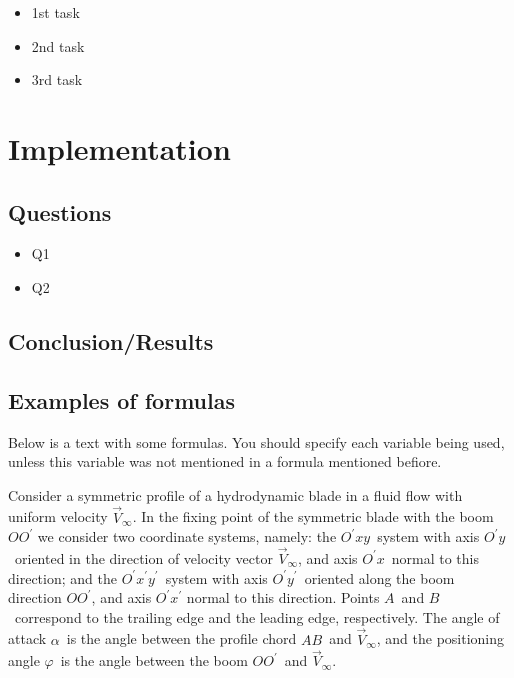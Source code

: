 \documentclass[12pt]{article}
\begin{document}
  \begin{itemize}
    \renewcommand{\labelitemi}{$\circ$}
    \item 1st task
    \item 2nd task
    \item 3rd task
  \end{itemize}


  \section{Implementation}

  \subsection{Questions}

  \begin{itemize}
    \renewcommand{\labelitemi}{$\circ$}
    \item Q1
    \item Q2
   \end{itemize}


    \subsection{Conclusion/Results}

 \subsection{Examples of formulas}
Below is a text with some formulas. You should specify each variable being used, unless this variable was not mentioned in a formula mentioned befiore.

Consider a symmetric profile of a hydrodynamic blade in a fluid flow with uniform velocity $\overrightarrow{V}_{\infty
} $. In the fixing point of the symmetric blade with the boom $OO^{\prime }$
we consider two coordinate systems, namely: the $O^{\prime }xy$\ system with
axis $O^{\prime }y$\ oriented in the direction of velocity vector $\overrightarrow{V}_{\infty }$, and axis $O^{\prime }x$\ normal to this direction; and the $O^{\prime }x^{\prime }y^{\prime }$\ system with axis $O^{\prime }y^{\prime }$\ oriented along the boom direction $OO^{\prime }$, and axis $O^{\prime }x^{\prime }$ normal to this direction. Points $A$\ and $B$\ correspond to the trailing edge and the leading edge, respectively. The angle of attack $\alpha $\ is the angle between the profile chord $AB$\ and $\overrightarrow{V}_{\infty}$, and the positioning angle $\varphi $\ is the
angle between the boom $OO^{\prime }$\ and $\overrightarrow{V}_{\infty }$.
\end{document}
